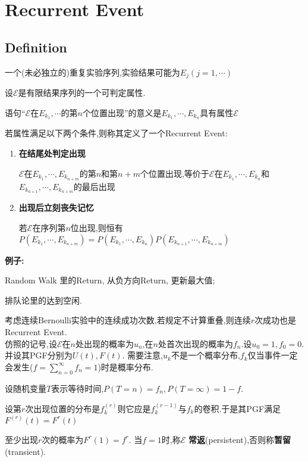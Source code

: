 \section{Recurrent Event}
\subsection{Definition}
一个(未必独立的)重复实验序列,实验结果可能为$ E_j(j=1,\cdots )$

设$ \mathcal{E}$是有限结果序列的一个可判定属性.

语句``$ \mathcal{E}$在$ E_{k_1},\cdots $的第$ n$个位置出现''的意义是$ E_{k_1},\cdots ,E_{k_n}$具有属性$ \mathcal{E}$

若属性满足以下两个条件,则称其定义了一个Recurrent Event:
\begin{enumerate}
    \item \textbf{在结尾处判定出现}

      $ \mathcal{E}$在$ E_{k_1},\cdots,E_{k_{n+m}} $的第$ n$和第$ n+m$个位置出现,等价于$ \mathcal{E}$在$ E_{k_1},\cdots ,E_{k_n}$和$
      E_{k_{n+1}},\cdots ,E_{k_{n+m}}$的最后出现

      \item \textbf{出现后立刻丧失记忆}

        若$ \mathcal{E}$在序列第$ n$位出现,则恒有$ P(E_{k_1},\cdots ,E_{k_{n+m}}) = P(E_{k_1},\cdots ,E_{k_n})P(E_{k_{n+1}},\cdots ,E_{k_{n+m}})$
\end{enumerate}

\textbf{例子:}

Random Walk 里的Return, 从负方向Return, 更新最大值;

排队论里的达到空闲.

考虑连续Bernoulli实验中的连续成功次数,若规定不计算重叠,则连续$ r$次成功也是Recurrent Event.
\\

仿照的记号,设$ \mathcal{E}$在$ n$处出现的概率为$ u_n$,在$ n$处首次出现的概率为$ f_n$.设$ u_0 = 1, f_0=0$.并设其PGF分别为$ U(t),F(t)$.
需要注意,$ u_k$不是一个概率分布,$ f_k$仅当事件一定会发生($ f = \sum_{n=0}^\infty f_n = 1$)时是概率分布.

设随机变量$ T$表示等待时间,$ P(T=n) = f_n,P(T=\infty) = 1-f$.

设第$ r$次出现位置的分布是$ f^{(r)}_k$则它应是$ f^{(r-1)}_k与f_k$的卷积.于是其PGF满足 $ F^{(r)}(t) = F^r(t)$

至少出现$ r$次的概率为$ F^r(1) = f^r$. 当$ f=1$时,称$ \mathcal{E}$ \textbf{常返}(persistent),否则称\textbf{暂留}(transient).

